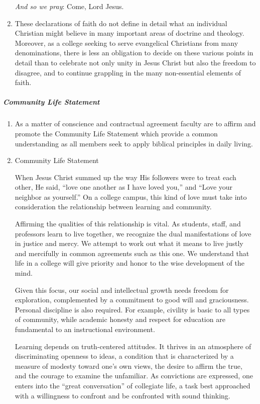 \begin{enumerate}[label=\alph*)]
						\quad \textit{And so we pray}:  Come, Lord Jesus.

						\item{These declarations of faith do not define in detail what an individual Christian might believe in many important areas of doctrine and theology.  Moreover, as a college seeking to serve evangelical Christians from many denominations, there is less an obligation to decide on these various points in detail than to celebrate not only unity in Jesus Christ but also the freedom to disagree, and to continue grappling in the many non-essential elements of faith.}

					\end{enumerate}
				\subparagraph{Community Life Statement}
					\label{sec:CommunityLifeStatement}
					\begin{enumerate}[label=\alph*)]
						\item{As a matter of conscience and contractual agreement faculty are to affirm and promote the Community Life Statement which provide a common understanding as all members seek to apply biblical principles in daily living.}
						\item{Community Life Statement

							\quad When Jesus Christ summed up the way His followers were to treat each other, He said, ``love one another as I have loved you,'' and ``Love your neighbor as yourself.''  On a college campus, this kind of love must take into consideration the relationship between learning and community.

							\quad Affirming the qualities of this relationship is vital.  As students, staff, and professors learn to live together, we recognize the dual manifestations of love in justice and mercy.  We attempt to work out what it means to live justly and mercifully in common agreements such as this one.  We understand that life in a college will give priority and honor to the wise development of the mind.

							\quad Given this focus, our social and intellectual growth needs freedom for exploration, complemented by a commitment to good will and graciousness.  Personal discipline is also required.  For example, civility is basic to all types of community, while academic honesty and respect for education are fundamental to an instructional environment.

							\quad Learning depends on truth-centered attitudes.  It thrives in an atmosphere of discriminating openness to ideas, a condition that is characterized by a measure of modesty toward one's own views, the desire to affirm the true, and the courage to examine the unfamiliar.  As convictions are expressed, one enters into the ``great conversation'' of collegiate life, a task best approached with a willingness to confront and be confronted with sound thinking.

}
\end{enumerate}
